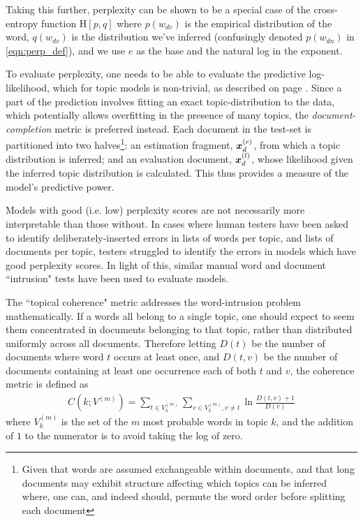 Taking this further, perplexity can be shown to be a special case of the cross-entropy function $\text{H}[p,q]$ where $p(w_{dv})$ is the empirical distribution of the word, $q(w_{dv})$ is the distribution we've inferred (confusingly denoted $p(w_{dn})$ in \eqref{eqn:perp_def}), and we use $e$ as the base and the natural log in the exponent. 

To evaluate perplexity, one needs to be able to evaluate the predictive log-likelihood, which for topic models is non-trivial, as described on page \pageref{chap1:lda-prediction}. Since a part of the prediction involves fitting an exact topic-distribution to the data, which potentially allows overfitting in the presence of many topics, the \emph{document-completion} metric is preferred\cite{Virtanen2012a}\cite{Asuncion2012}\cite{RosenZvi2004} instead. Each document in the test-set is partitioned into two halves\footnote{Given that words are assumed exchangeable within documents, and that long documents may exhibit structure affecting which topics can be inferred where, one can, and indeed should, permute the word order before splitting each document}: an estimation fragment, $\bm x_d^{(e)}$, from which a topic distribution is inferred; and an evaluation document, $\bm x_d^{(l)}$, whose likelihood given the inferred topic distribution is calculated. This thus provides a measure of the model's predictive power.

Models with good (i.e. low) perplexity scores are not necessarily more interpretable than those without. In cases where human testers have been asked to identify deliberately-inserted errors in lists of words per topic, and lists of documents per topic, testers struggled to identify the errors in models which have good perplexity scores\cite{Chang2009}. In light of this, similar manual word and document ``intrusion" tests have been used to evaluate models\cite{Li2006}\cite{Wang2007}\cite{Lindsey2012}.

The ``topical coherence" metric\cite{Mimno2011}\cite{Mimno2012a} addresses the word-intrusion problem mathematically. If a words all belong to a single topic, one should expect to seem them concentrated in documents belonging to that topic, rather than distributed uniformly across all documents. Therefore letting $D(t)$ be the number of documents where word $t$ occurs at least once, and $D(t,v)$ be the number of documents containing at least one occurrence each of both $t$ and $v$, the coherence metric is defined as
\begin{align}
C(k; V^{(m)}) = \sum_{t \in V^{(m)}_k} \sum_{v \in V^{(m)}_k,  v \neq t} \ln \frac{D(t, v) + 1}{D(v)}
\end{align}
where $V^{(m)}_k$ is the set of the $m$ most probable words in topic $k$, and the addition of $1$ to the numerator is to avoid taking the log of zero. 

